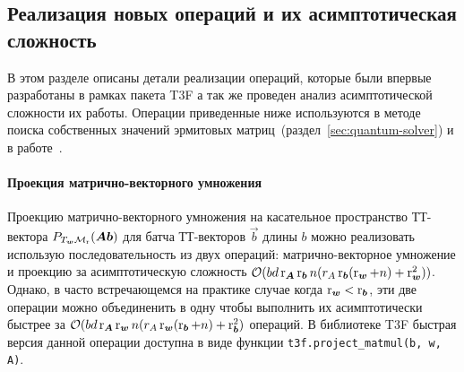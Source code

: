 \subsection{Реализация новых операций и их асимптотическая сложность}
В этом разделе описаны детали реализации операций, которые были впервые разработаны в рамках пакета T3F а так же проведен анализ асимптотической сложности их работы. Операции приведенные ниже используются в методе поиска собственных значений эрмитовых матриц~(раздел~\ref{sec:quantum-solver}) и в работе~\cite{izmailov2018scalable}.


\paragraph{Проекция матрично-векторного умножения}
Проекцию матрично-векторного умножения на касательное пространство ТТ-вектора $P_{T_{\boldsymbol{w}} \mathcal{M}_{\operatorname{r}}} (\boldsymbol{A}\boldsymbol{b})$ для батча ТТ-векторов $\vec{b}$ длины $b$ можно реализовать использую последовательность из двух операций: матрично-векторное умножение и проекцию за асимптотическую сложность $\mathcal{O}(b d \operatorname{r}_{\boldsymbol{A}} \operatorname{r}_{\boldsymbol{b}} n (r_A \operatorname{r}_{\boldsymbol{b}} (\operatorname{r}_{\boldsymbol{w}} + n) + \operatorname{r}_{\boldsymbol{w}}^2))$. Однако, в часто встречающемся на практике случае когда $\operatorname{r}_{\boldsymbol{w}} < \operatorname{r}_{\boldsymbol{b}}$, эти две операции можно объединенить в одну чтобы выполнить их асимптотически быстрее за $\mathcal{O}(b d \operatorname{r}_{\boldsymbol{A}} \operatorname{r}_{\boldsymbol{w}} n (r_A \operatorname{r}_{\boldsymbol{w}} (\operatorname{r}_{\boldsymbol{b}} + n) + \operatorname{r}_{\boldsymbol{b}}^2)$ операций. В библиотеке T3F быстрая версия данной операции доступна в виде функции \texttt{t3f.project\_matmul(b, w, A)}.

